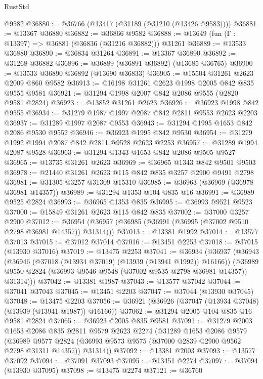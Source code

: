 \begin{lexlean}{RustStd}
\begin{coremodule}
    @9582
@36880 := @36766 (@13417 (@31189 (@31210 (@13426 @9583))))
@36881 := @13367 @36880
@36882 := @36866 @9582
@36888 := @13649 (fun (Γ : @13397) => @36881 (@36836 (@31216 @36882))) @31261
@36889 := @13533 @36880
@36890 := @36834 @31264
@36891 := @13367 @36890
@36892 := @31268 @36882
@36896 := @36889 (@36891 @36892) (@13685 @36765)
@36900 := @13533 @36890 @36892 (@13690 @36833)
@36905 := @15504 @31261 @2623 @2009 @860 @9582
@36913 := @16198 @31261 @2623 @1998 @2005 @842 @835 @9555 @9581
@36921 := @31294 @1998 @2007 @842 @2086 @9555 (@2820 @9581 @2824)
@36923 := @13852 @31261 @2623
@36926 := @36923 @1998 @842 @9555
@36934 := @31279 @1987 @1997 @2087 @842 @2811 @9553 @2623 @2203
@36937 := @31289 @1997 @2087 @9553
@36943 := @31294 @1995 @1653 @842 @2086 @9530 @9552
@36946 := @36923 @1995 @842 @9530
@36954 := @31279 @1992 @1994 @2087 @842 @2811 @9528 @2623 @2253
@36957 := @31289 @1994 @2087 @9528
@36963 := @31294 @1343 @1653 @842 @2086 @9505 @9527
@36965 := @13735 @31261 @2623
@36969 := @36965 @1343 @842 @9501 @9503
@36978 := @21440 @31261 @2623 @115 @842 @835 @3257 @2900 @9491 @2798
@36981 := @31305 @3257 @31309 @15310
@36985 := @36963 (@36969 (@36978 @36981 @14357))
@36989 := @31294 @1353 @104 @835 @16
@36991 := @36989 @9525 @2824
@36993 := @36965 @1353 @835
@36995 := @36993 @9521 @9523
@37000 := @15849 @31261 @2623 @115 @842 @835
@37002 := @37000 @3257 @2900
@37012 := @36954 (@36957 (@36985 (@36991 (@36995 (@37002 @9510 @2798 @36981 @14357)) @31314)))
@37013 := @13381 @1992
@37014 := @13577 @37013
@37015 := @37012 @37014
@37016 := @13451 @2253
@37018 := @37015 (@13930 @37016)
@37019 := @13475 @2253
@37041 := @36934
    (@36937
      (@36943
        (@36946 (@37018 (@13934 @37019) (@13939 (@13941 @1992)) @16166))
        (@36989 @9550 @2824 (@36993 @9546 @9548 (@37002 @9535 @2798 @36981 @14357)) @31314)))
@37042 := @13381 @1987
@37043 := @13577 @37042
@37044 := @37041 @37043
@37045 := @13451 @2203
@37047 := @37044 (@13930 @37045)
@37048 := @13475 @2203
@37056 := @36921 (@36926 (@37047 (@13934 @37048) (@13939 (@13941 @1987)) @16166))
@37062 := @31294 @2005 @104 @835 @16 @9581 @2824
@37065 := @36923 @2005 @835 @9581
@37091 := @31279
    @2003
    @1653
    @2086
    @835
    @2811
    @9579
    @2623
    @2274
    (@31289
      @1653
      @2086
      @9579
      (@36989
        @9577
        @2824
        (@36993 @9573 @9575 (@37000 @2839 @2900 @9562 @2798 @31311 @14357))
        @31314))
@37092 := @13381 @2003
@37093 := @13577 @37092
@37094 := @37091 @37093
@37095 := @13451 @2274
@37097 := @37094 (@13930 @37095)
@37098 := @13475 @2274
@37121 := @36760

\end{coremodule}
\end{lexlean}

